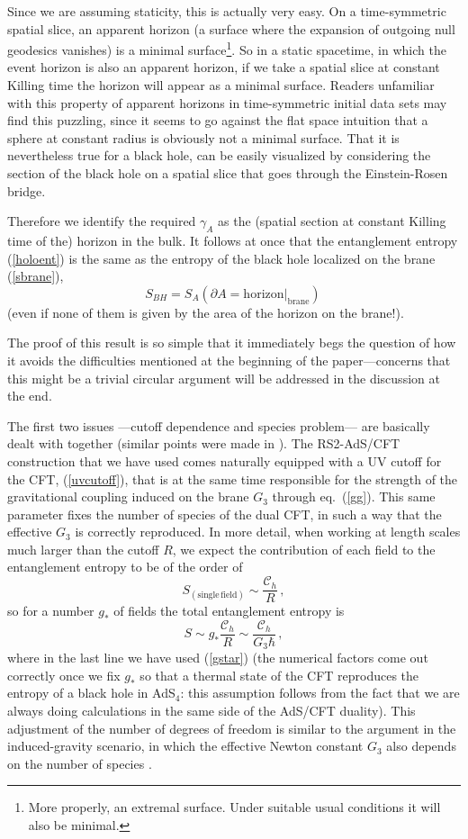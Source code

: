 \documentclass[12pt]{article}
\newcommand{\beq}{\begin{equation}}
\newcommand{\eeq}{\end{equation}}
\newcommand{\reef}[1]{(\ref{#1})}
\begin{document}
Since we are assuming staticity, this is actually very easy. On a
time-symmetric spatial slice, an apparent horizon (a surface where the
expansion of outgoing null geodesics vanishes) is a minimal
surface\footnote{More properly, an extremal surface. Under suitable
usual conditions it will also be minimal.}. So in a static spacetime, in
which the event horizon is also an apparent horizon, if we take a
spatial slice at constant Killing time the horizon will appear as a
minimal surface. Readers unfamiliar with this property of apparent
horizons in time-symmetric initial data sets may find this puzzling,
since it seems to go against the flat space intuition that a sphere at
constant radius is obviously not a minimal surface. That it is
nevertheless true for a black hole, can be easily visualized by
considering the section of the black hole on a spatial slice that goes
through the Einstein-Rosen bridge.

Therefore we identify the required $\gamma_A$ as the (spatial section at
constant Killing time of the) horizon in the bulk. It follows at once
that the entanglement entropy \reef{holoent} is the same as the entropy
of the black hole localized on the brane \reef{sbrane},
\beq\label{main}
S_{BH}=S_{A}(\partial A=\mathrm{horizon|_{brane}})\,
\eeq
(even if none of them is given by the area of the horizon on the
brane!).

The proof of this result is so simple that it immediately begs the
question of how it avoids the difficulties mentioned at the beginning of
the paper---concerns that this might be a trivial circular argument
will be addressed in the discussion at the end. 

The first two issues ---cutoff dependence and species problem--- are
basically dealt with together (similar points were made in \cite{hms}).
The RS2-AdS/CFT construction that we have used comes naturally equipped
with a UV cutoff for the CFT, \reef{uvcutoff}, that is at the same time
responsible for the strength of the gravitational coupling induced on
the brane $G_{3}$ through eq.~\reef{gg}. This same parameter fixes the
number of species of the dual CFT, in such a way that the effective
$G_{3}$ is correctly reproduced. In more detail, when working at length
scales much larger than the cutoff $R$, we expect the contribution of
each field to the entanglement entropy to be of the order of
\beq\label{onefield}
S_{(\mathrm{single\, field})}\sim \frac{\mathcal{C}_{h}}{R}\,,
\eeq
so for a number
$g_*$ of fields the total entanglement entropy is
\beq\label{}
S\sim g_*\frac{\mathcal{C}_{h}}{R}\sim
\frac{\mathcal{C}_{h}}{G_3\hbar}\,,
\eeq
where in the last line we have used \reef{gstar} (the numerical factors
come out correctly once we fix $g_*$ so that a thermal state of the CFT
reproduces the entropy of a black hole in AdS$_4$: this assumption
follows from the fact that we are always doing calculations in the same
side of the AdS/CFT duality). 
This adjustment of the number of degrees of freedom is similar to the
argument in the induced-gravity scenario, in which the effective Newton
constant $G_3$ also depends on the number of species \cite{jac}. 
\end{document}
